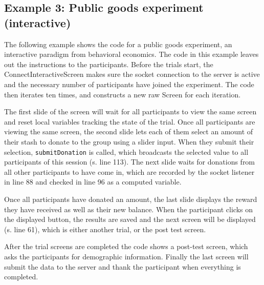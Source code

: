 \documentclass[a4paper,11pt]{scrreprt}
\begin{document}
\subsection{Example 3: Public goods experiment (interactive)}
The following example shows the code for a public goods experiment, an interactive paradigm from behavioral economics. The code in this example leaves out the instructions to the participants. Before the trials start, the ConnectInteractiveScreen makes sure the socket connection to the server is active and the necessary number of participants have joined the experiment. The code then iterates ten times, and constructs a new raw Screen for each iteration.

The first slide of the screen will wait for all participants to view the same screen and reset local variables tracking the state of the trial. Once all participants are viewing the same screen, the second slide lets each of them select an amount of their stash to donate to the group using a slider input. When they submit their selection, \texttt{submitDonation} is called, which broadcasts the selected value to all participants of this session (s. line 113). The next slide waits for donations from all other participants to have come in, which are recorded by the socket listener in line 88 and checked in line 96 as a computed variable.

Once all participants have donated an amount, the last slide displays the reward they have received as well as their new balance. When the participant clicks on the displayed button, the results are saved and the next screen will be displayed (s. line 61), which is either another trial, or the post test screen.

After the trial screens are completed the code shows a post-test screen, which asks the participants for demographic information. Finally the last screen will submit the data to the server and thank the participant when everything is completed.
\end{document}
